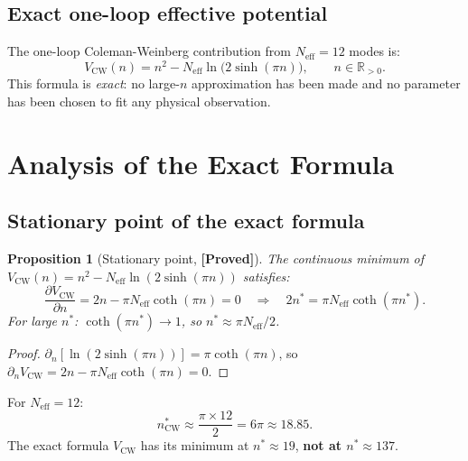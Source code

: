 \documentclass[12pt,a4paper]{article}
\newtheorem{proposition}[theorem]{Proposition}
\theoremstyle{definition}
\theoremstyle{remark}
\newcommand{\RR}{\mathbb{R}}
\newcommand{\PROVED}{\textbf{[Proved]}}
\begin{document}
\subsection{Exact one-loop effective potential}

The one-loop Coleman-Weinberg contribution from $N_{\mathrm{eff}} = 12$ modes is:
\begin{equation}
  \boxed{
    V_{\mathrm{CW}}(n)
    = n^2 - N_{\mathrm{eff}} \ln\bigl(2\sinh(\pi n)\bigr),
    \qquad n \in \RR_{>0}.
  }
  \label{eq:cw:Vcw}
\end{equation}
This formula is \emph{exact}: no large-$n$ approximation has been made and
no parameter has been chosen to fit any physical observation.

\section{Analysis of the Exact Formula}
\label{sec:cw:analysis}

\subsection{Stationary point of the exact formula}

\begin{proposition}[Stationary point, \PROVED]
\label{prop:cw:nstar_exact}
The continuous minimum of $V_{\mathrm{CW}}(n) = n^2 - N_{\mathrm{eff}}\ln(2\sinh(\pi n))$ satisfies:
\begin{equation}
  \frac{\partial V_{\mathrm{CW}}}{\partial n} = 2n - \pi N_{\mathrm{eff}} \coth(\pi n) = 0
  \quad\Longrightarrow\quad
  2n^* = \pi N_{\mathrm{eff}} \coth(\pi n^*).
  \label{eq:cw:nstar_exact}
\end{equation}
For large $n^*$: $\coth(\pi n^*) \to 1$, so $n^* \approx \pi N_{\mathrm{eff}}/2$.
\end{proposition}

\begin{proof}
$\partial_n [\ln(2\sinh(\pi n))] = \pi \coth(\pi n)$, so
$\partial_n V_{\mathrm{CW}} = 2n - \pi N_{\mathrm{eff}}\coth(\pi n) = 0$.
\end{proof}

\begin{resultbox}
For $N_{\mathrm{eff}} = 12$:
\[
  n^*_{\mathrm{CW}} \approx \frac{\pi \times 12}{2} = 6\pi \approx 18.85.
\]
The exact formula $V_{\mathrm{CW}}$ has its minimum at $n^* \approx 19$, \textbf{not at $n^* \approx 137$}.
\end{resultbox}
\end{document}
